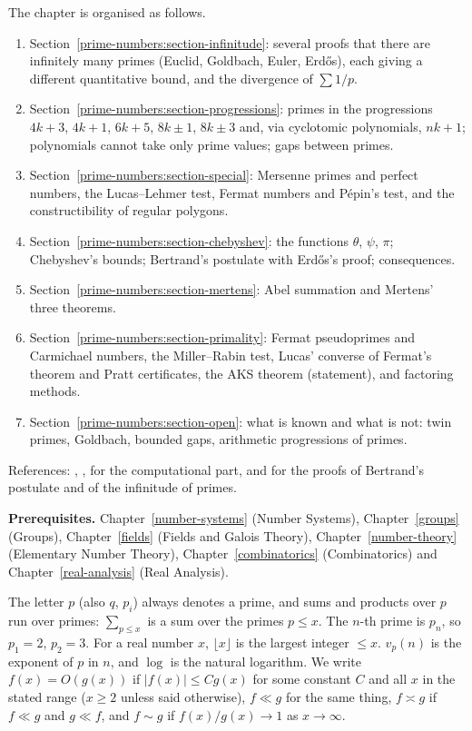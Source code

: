 The chapter is organised as follows.
\begin{enumerate}
\item Section~\ref{prime-numbers:section-infinitude}: several proofs that there are infinitely many primes (Euclid, Goldbach, Euler, Erd\H{o}s), each giving a different quantitative bound, and
the divergence of $\sum 1/p$.
\item Section~\ref{prime-numbers:section-progressions}: primes in the progressions $4k + 3$, $4k + 1$, $6k + 5$, $8k \pm 1$, $8k \pm 3$ and, via cyclotomic polynomials, $nk + 1$; polynomials cannot
take only prime values; gaps between primes.
\item Section~\ref{prime-numbers:section-special}: Mersenne primes and perfect numbers, the Lucas--Lehmer test, Fermat numbers and Pépin's test, and the constructibility of regular polygons.
\item Section~\ref{prime-numbers:section-chebyshev}: the functions $\theta$, $\psi$, $\pi$; Chebyshev's bounds; Bertrand's postulate with Erd\H{o}s's proof; consequences.
\item Section~\ref{prime-numbers:section-mertens}: Abel summation and Mertens' three theorems.
\item Section~\ref{prime-numbers:section-primality}: Fermat pseudoprimes and Carmichael numbers, the Miller--Rabin test, Lucas' converse of Fermat's theorem and Pratt certificates, the AKS
theorem (statement), and factoring methods.
\item Section~\ref{prime-numbers:section-open}: what is known and what is not: twin primes, Goldbach, bounded gaps, arithmetic progressions of primes.
\end{enumerate}
References: \cite{hardy-wright}, \cite{ireland-rosen}, \cite{crandall-pomerance} for the computational part, and \cite{aigner-ziegler} for the proofs of Bertrand's postulate and of the
infinitude of primes.

\noindent\textbf{Prerequisites.} Chapter~\ref{number-systems} (Number Systems), Chapter~\ref{groups} (Groups), Chapter~\ref{fields} (Fields and Galois Theory),
Chapter~\ref{number-theory} (Elementary Number Theory), Chapter~\ref{combinatorics} (Combinatorics) and Chapter~\ref{real-analysis} (Real Analysis).

\begin{notation}\label{prime-numbers:notation-basic}
The letter $p$ (also $q$, $p_i$) always denotes a prime, and sums and products over $p$ run over primes: $\sum_{p \leq x}$ is a sum over the primes $p \leq x$. The $n$-th prime is $p_n$, so
$p_1 = 2$, $p_2 = 3$. For a real number $x$, $\lfloor x\rfloor$ is the largest integer $\leq x$. $v_p(n)$ is the exponent of $p$ in $n$, and $\log$ is the natural logarithm. We write
$f(x) = O(g(x))$ if $|f(x)| \leq Cg(x)$ for some constant $C$ and all $x$ in the stated range ($x \geq 2$ unless said otherwise), $f \ll g$ for the same thing, $f \asymp g$ if $f \ll g$ and
$g \ll f$, and $f \sim g$ if $f(x)/g(x) \to 1$ as $x \to \infty$.
\end{notation}


